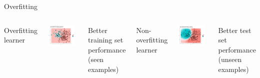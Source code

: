 \begin{frame}{Overfitting}

\begin{columns}[T,onlytextwidth]
Overfitting learner \\
\vspace{0.5cm}

\scriptsize

\begin{center}
\includegraphics[width=0.9\textwidth]{plots/overfitting-learner.png}
\end{center}

\normalsize 
Better training set performance (seen examples)

Non-overfitting learner \\
\vspace{0.5cm}

 \scriptsize
\begin{center}
\includegraphics[width=0.9\textwidth]{plots/non-overfitting-learner.png}
\end{center}

 \normalsize 
Better test set performance (unseen examples)
\end{columns}

\end{frame}

